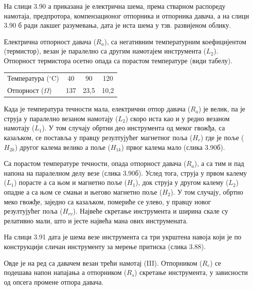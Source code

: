 \documentclass[12pt,a4paper]{report}
\begin{document}
На слици 3.90 а приказана је електрична шема, према стварном распореду намотаја, предпротора, компензационог отпорника и отпорника давача, а на слици 3.90 б ради лакшег разумевања, дата је иста шема у тзв. развијеном облику.

Електрична отпорност давача ($R_a$), са негативним температурним коефицијентом (термистор), везан је паралелно са другим намотајем инструмента ($L_2$). Отпорност термистора осетно опада са порастом температуре (види табелу).

\begin{center}
\begin{tabular}{lccc}
\hline
Температура ($^\circ\text{C}$) & 40 & 90 & 120 \\
Отпорност ($\Omega$) & 137 & 23,5 & 10,2 \\
\hline
\end{tabular}
\end{center}

Када је температура течности мала, електрични отпор давача ($R_a$) је велик, па је струја у паралелно везаном намотају ($L_2$) скоро иста као и у редно везаном намотају ($L_1$). У том случају обртни део инструмента од
меког гвожђа, са казаљком, се поставља у правцу резултујућег магнетног поља ($H_r$) где је поље ($H_{2k}$) другог калема велико а поље ($H_{1k}$) првог калема мало (слика 3.90б).

Са порастом температуре течности, опада отпорност давача ($R_a$), а са тим и пад напона на паралелном делу везе (слика 3.90б). Услед тога, струја у првом калему ($L_1$) порасте а са њом и магнетно поље ($H_1$), док струја у другом калему ($L_2$) опадне а са њом се смањи и његово магнетно поље ($H_2$). У том случају, обртно меко гвожђе, заједно са казаљком, помериће се улево, у правцу новог резултујућег поља ($H_{rv}$). Највеће скретање инструмента и ширина скале су релативно мали, што и јесте највећа мана ових инструмената.

На слици 3.91 дата је шема везе инструмента са три укрштена навоја који је по конструкцији сличан инструменту за мерење притиска (слика 3.88).


Овде је на ред са давачем везан трећи намотај (III). Отпорником ($R_e$) се подешава напон напајања а отпорником ($R_s$) скретање инструмента, у зависности од опсега промене отпора давача.
\end{document}
